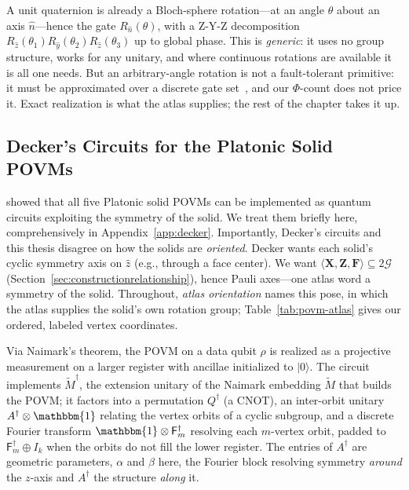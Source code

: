 \documentclass[11pt, oneside, openany]{scrbook}
\newcommand{\Id}{\mathbbm{1}}
\newcommand{\Ggroup}{\mathcal{G}}
\newcommand{\TwoG}{2\Ggroup}
\newcommand{\ket}[1]{|#1\rangle}
\begin{document}
A unit quaternion is already a Bloch-sphere rotation---at an angle $\theta$ about an axis $\hat{n}$---hence the gate $R_{\hat{n}}(\theta)$, with a Z-Y-Z decomposition $R_{\hat z}(\theta_1)R_{\hat y}(\theta_2)R_{\hat z}(\theta_3)$ up to global phase. This is \textit{generic}: it uses no group structure, works for any unitary, and where continuous rotations are available it is all one needs. But an arbitrary-angle rotation is not a fault-tolerant primitive: it must be approximated over a discrete gate set~\cite[\S4.5.3]{nielsen2010quantumcomputationquantum}, and our $\Phi$-count does not price it. Exact realization is what the atlas supplies; the rest of the chapter takes it up.

\subsection{Decker's Circuits for the Platonic Solid POVMs} \label{subsec:deckercircuits}

\textcite{decker2004quantumcircuitssinglequbit} showed that all five Platonic solid POVMs can be implemented as quantum circuits exploiting the symmetry of the solid. We treat them briefly here, comprehensively in Appendix~\ref{app:decker}. Importantly, Decker's circuits and this thesis disagree on how the solids are \textit{oriented}. Decker wants each solid's cyclic symmetry axis on $\hat z$ (e.g., through a face center). We want $\langle \mathbf{X}, \mathbf{Z}, \mathbf{F} \rangle \subseteq \TwoG$ (Section~\ref{sec:constructionrelationship}), hence Pauli axes---one atlas word a symmetry of the solid. Throughout, \textit{atlas orientation} names this pose, in which the atlas supplies the solid's own rotation group; Table~\ref{tab:povm-atlas} gives our ordered, labeled vertex coordinates. %

Via Naimark's theorem, the POVM on a data qubit $\rho$ is realized as a projective measurement on a larger register with ancillae initialized to $\ket{0}$. The circuit implements $\tilde{M}^\dagger$, the extension unitary of the Naimark embedding $\tilde{M}$ that builds the POVM; it factors into a permutation $Q^\dagger$ (a CNOT), an inter-orbit unitary $A^\dagger \otimes \Id$ relating the vertex orbits of a cyclic subgroup, and a discrete Fourier transform $\Id \otimes \mathsf{F}_m^\dagger$ resolving each $m$-vertex orbit, padded to $\mathsf{F}_m^\dagger \oplus I_k$ when the orbits do not fill the lower register. The entries of $A^\dagger$ are geometric parameters, $\alpha$ and $\beta$ here, the Fourier block resolving symmetry \textit{around} the $z$-axis and $A^\dagger$ the structure \textit{along} it.
\end{document}
